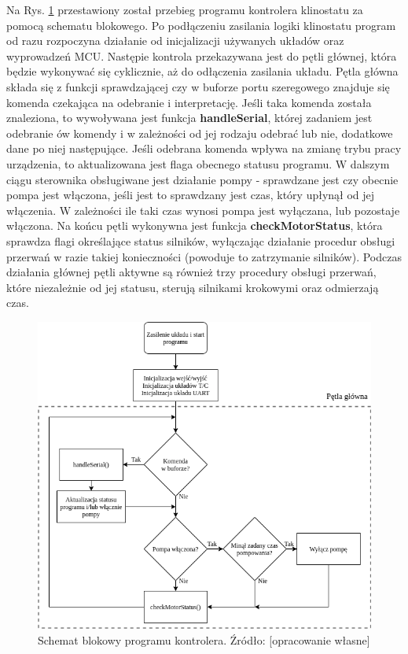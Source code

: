 Na Rys. \ref{fig:schemat_sterownik} przestawiony został przebieg programu kontrolera klinostatu za pomocą schematu blokowego. Po podłączeniu zasilania logiki klinostatu program od razu rozpoczyna działanie od inicjalizacji używanych układów oraz wyprowadzeń MCU. Następie kontrola przekazywana jest do pętli głównej, która będzie wykonywać się cyklicznie, aż do odłączenia zasilania układu. Pętla główna składa się z funkcji sprawdzającej czy w buforze portu szeregowego znajduje się komenda czekająca na odebranie i interpretację. Jeśli taka komenda została znaleziona, to wywoływana jest funkcja \textbf{handleSerial}, której zadaniem jest odebranie ów komendy i w zależności od jej rodzaju odebrać lub nie, dodatkowe dane po niej następujące. Jeśli odebrana komenda wpływa na zmianę trybu pracy urządzenia, to aktualizowana jest flaga obecnego statusu programu. W dalszym ciągu sterownika obsługiwane jest działanie pompy - sprawdzane jest czy obecnie pompa jest włączona, jeśli jest to sprawdzany jest czas, który upłynął od jej włączenia. W zależności ile taki czas wynosi pompa jest wyłączana, lub pozostaje włączona. Na końcu pętli wykonywna jest funkcja \textbf{checkMotorStatus}, która sprawdza flagi określające status silników, wyłączając działanie procedur obsługi przerwań w razie takiej konieczności (powoduje to zatrzymanie silników). Podczas działania głównej pętli aktywne są również trzy procedury obsługi przerwań, które niezależnie od jej statusu, sterują silnikami krokowymi oraz odmierzają czas.
\begin{figure}[H]
	\centering
	\includegraphics[scale=0.5]{sterownik_schemat}
	\caption{Schemat blokowy programu kontrolera. Źródło: [opracowanie własne]} 
	\label{fig:schemat_sterownik}
\end{figure}



